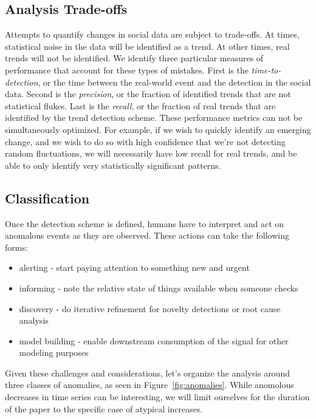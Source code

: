 \documentclass{article}
\begin{document}
\subsection{Analysis Trade-offs}
Attempts to quantify changes in social data are subject to trade-offs. 
At times, statistical noise in the data will be identified as a trend.
At other times, real trends will not be identified. We identify three 
particular measures of performance that account for these types of mistakes.
First is the \textit{time-to-detection}, or the time between the
real-world event and the detection in the social data. 
Second is the \textit{precision}, or the fraction of identified trends 
that are not statistical flukes. 
Last is the \textit{recall}, or the fraction of real trends that are identified
by the trend detection scheme.
These performance metrics can not be simultaneously optimized.
For example, if we wish to quickly identify an
emerging change, and we wish to do so with high confidence that we’re not
detecting random fluctuations, we will necessarily have 
low recall for real trends, and be 
able to only identify very statistically significant patterns.

\subsection{Classification}
Once the detection scheme is defined, humans have to interpret
and act on anomalous events as they are observed. These actions can take the
following forms:

\begin{itemize} 
    \item alerting - start paying attention to something new and urgent 
    \item informing - note the relative state of things available when someone 
        checks 
    \item discovery - do iterative refinement for novelty detections or root 
        cause analysis 
    \item model building - enable downstream consumption of the signal for 
        other modeling purposes 
\end{itemize}

Given these challenges and considerations, let’s organize the analysis around
three classes of anomalies, as seen in Figure~\ref{fig:anomalies}. While
anomolous decreases in time series can be interesting, we will limit ourselves
for the duration of the paper to the specific case of atypical increases.
\end{document}
